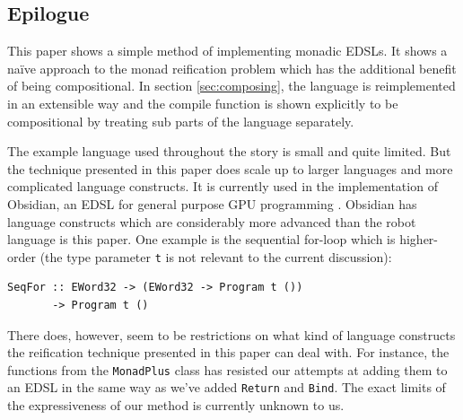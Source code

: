 


\subsection{Epilogue} 


This paper shows a simple method of implementing monadic EDSLs. It shows a
na\"ive approach to the monad reification problem which has the additional benefit of being compositional. In section 
\ref{sec:composing}, the language is reimplemented in an extensible way and 
the compile function is shown explicitly to be compositional by treating sub 
parts of the language separately.  

The example language used throughout the story is small and quite
limited. But the technique presented in this paper does scale up to
larger languages and more complicated language constructs.  It is
currently used in the implementation of Obsidian, an EDSL for general
purpose GPU programming . Obsidian has language
constructs which are considerably more advanced than the robot
language is this paper. One example is the sequential for-loop which
is higher-order (the type parameter {\tt t} is not relevant to the
current discussion):
\begin{small}
\begin{verbatim}
SeqFor :: EWord32 -> (EWord32 -> Program t ())
       -> Program t ()
\end{verbatim}
\end{small}
There does, however, seem to be restrictions on what kind of language
constructs the reification technique presented in this paper can deal
with. For instance, the functions from the {\tt MonadPlus} class has
resisted our attempts at adding them to an EDSL in the same way as
we've added {\tt Return} and {\tt Bind}. The exact limits of the
expressiveness of our method is currently unknown to us.


